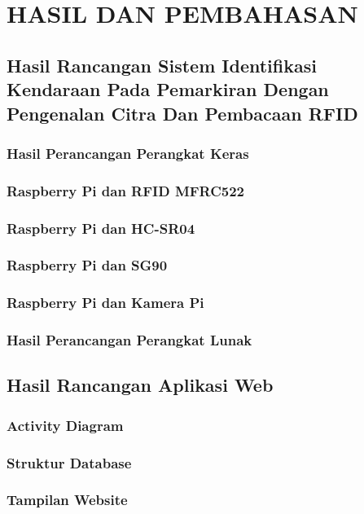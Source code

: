 \chapter{HASIL DAN PEMBAHASAN}

\section{Hasil Rancangan Sistem Identifikasi Kendaraan Pada Pemarkiran Dengan Pengenalan Citra Dan Pembacaan RFID}

\subsection{Hasil Perancangan Perangkat Keras}

\subsection{Raspberry Pi dan RFID MFRC522}

\subsection{Raspberry Pi dan HC-SR04}

\subsection{Raspberry Pi dan SG90}

\subsection{Raspberry Pi dan Kamera Pi}

\subsection{Hasil Perancangan Perangkat Lunak}

\section{Hasil Rancangan Aplikasi Web}

\subsection{Activity Diagram}

\subsection{Struktur Database}

\subsection{Tampilan Website}